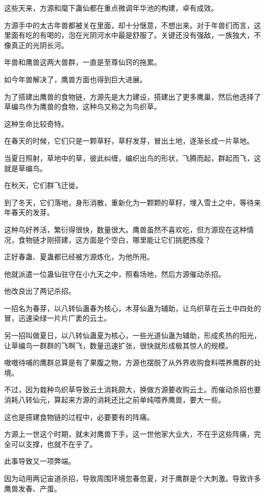 \begin{this_body}
这些天来，方源和麾下蛊仙都在重点微调年华池的构建，卓有成效。

方源手中的太古年兽都被关在里面，却十分惬意，不想出来。对于年兽们而言，这里面有吃的有喝的，泡在光阴河水中最是舒服了。关键还没有强敌，一族独大，不像真正的光阴长河。

年兽和鹰兽这两大兽群，一直是至尊仙窍的拖累。

如今年兽解决了，鹰兽方面也得到巨大进展。

为了搭建出鹰兽的食物链，方源先是大力建设，搭建出了更多鹰巢，然后他选择了草编鸟作为鹰兽的食物，这种鸟又称之为鸟织草。

这种生命比较奇特。

在春天的时候，它们只是一颗草籽，草籽发芽，冒出土地，逐渐长成一片草地。

当夏日照射，草地中的草，彼此纠缠，编织出鸟的形状，飞腾而起，群起而飞，这就是草编鸟。

在秋天，它们群飞迁徙。

到了冬天，它们落地，身形消散，重新化为一颗颗的草籽，埋入雪土之中，等待来年春天的发芽。

这种鸟好养活，繁衍得很快，数量很大。鹰兽虽然不喜欢吃，但方源现在这种情况，食物链才刚搭建，这方面是个空白，哪里能让它们挑肥拣瘦？

正好春蛊、夏蛊都已经被方源炼化，为他所用。

他就派遣一位蛊仙驻守在小九天之中，照看场地，然后方源催动杀招。

他改良出了两记杀招。

一招名为春芽，以八转仙蛊春为核心，木芽仙蛊为辅助，让鸟织草在云土中四处的冒，迅速染绿一片片广袤的云土。

另一招叫做夏日，以八转仙蛊夏为核心，一些光道仙蛊为辅助，形成炙热的阳光，让草编鸟一群群的飞啊飞，数量迅速扩张，很快就形成极其惊人的规模。

嗷嗷待哺的鹰群总算是有了果腹之物，方源也摆脱了从外界收购食料喂养鹰群的处境。

不过，因为栽种鸟织草导致云土消耗颇大，换做方源要收购云土。而催动杀招也要消耗八转仙元，算起来方源的消耗还比之前单纯喂养鹰兽，要大一些。

这也是搭建食物链的过程中，必要要有的阵痛。

方源上一世这个时期，就未对鹰兽下手。这一世他家大业大，不在乎这些阵痛，完全可以支撑，也就不在乎了。

此事导致又一项弊端。

因为动用两记宙道杀招，导致周围环境忽春忽夏，对于鹰群是个大刺激。导致许多鹰兽发春、产蛋。


\end{this_body}
